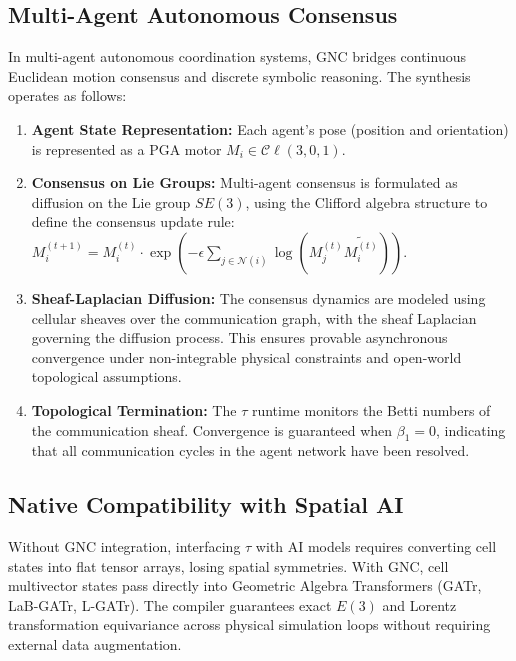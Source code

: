 \documentclass[manuscript, nonacm, review=false]{acmart}
\theoremstyle{definition}
\theoremstyle{plain}
\newcommand{\Cl}{\mathcal{C}\!\ell}
\newcommand{\toposLang}{\ensuremath{\tau}\text{-Lang}}
\begin{document}
\subsection{Multi-Agent Autonomous Consensus}
\label{subsec:multi_agent}

In multi-agent autonomous coordination systems, GNC bridges continuous Euclidean motion consensus and discrete symbolic reasoning. The synthesis operates as follows:

\begin{enumerate}[label=(\roman*)]
    \item \textbf{Agent State Representation:} Each agent's pose (position and orientation) is represented as a PGA motor $M_i \in \Cl(3,0,1)$.
    
    \item \textbf{Consensus on Lie Groups:} Multi-agent consensus is formulated as diffusion on the Lie group $SE(3)$, using the Clifford algebra structure to define the consensus update rule: $M_i^{(t+1)} = M_i^{(t)} \cdot \exp\left(-\epsilon \sum_{j \in \mathcal{N}(i)} \log(M_j^{(t)} \widetilde{M_i^{(t)}})\right)$.
    
    \item \textbf{Sheaf-Laplacian Diffusion:} The consensus dynamics are modeled using cellular sheaves over the communication graph, with the sheaf Laplacian governing the diffusion process. This ensures provable asynchronous convergence under non-integrable physical constraints and open-world topological assumptions.
    
    \item \textbf{Topological Termination:} The \toposLang{} runtime monitors the Betti numbers of the communication sheaf. Convergence is guaranteed when $\beta_1 = 0$, indicating that all communication cycles in the agent network have been resolved.
\end{enumerate}


\subsection{Native Compatibility with Spatial AI}
\label{subsec:spatial_ai}

Without GNC integration, interfacing \toposLang{} with AI models requires converting cell states into flat tensor arrays, losing spatial symmetries. With GNC, cell multivector states pass directly into Geometric Algebra Transformers (GATr, LaB-GATr, L-GATr). The compiler guarantees exact $E(3)$ and Lorentz transformation equivariance across physical simulation loops without requiring external data augmentation.
\end{document}
